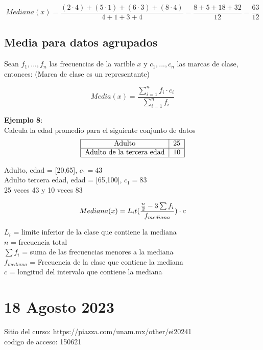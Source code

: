 \documentclass{article}
\begin{document}
\[
    Mediana(x) = \frac{(2\cdot4) + (5\cdot1) + (6\cdot3) + (8\cdot4)}{4+1+3+4} = \frac{8+5+18+32}{12} = \frac{63}{12}
\]

\subsection{Media para datos agrupados}

Sean $f_1, ... , f_n$ las frecuencias de la varible $x$ y $c_1, ... , c_n$ las marcas de clase, entonces: (Marca de clase es un representante)

\[
    Media(x) = \frac{\sum^{n}_{i=1}f_i \cdot c_i}{\sum^{n}_{i=1}f_i}
\]

\textbf{Ejemplo 8}: \\
Calcula la edad promedio para el siguiente conjunto de datos
\[
    \begin{tabular}{|c|c|}
        \hline
        Adulto                    & 25 \\
        \hline
        Adulto de la tercera edad & 10 \\
        \hline
    \end{tabular}
\]

Adulto, edad = [20,65], $c_1 = 43$ \\
Adulto tercera edad, edad = [65,100], $c_1 = 83$\\

25 veces 43 y 10 veces 83

\[
    Mediana(x) = L_{i} t(\frac{\frac{n}{2} - 3 \sum f_i}{f_{mediana}}) \cdot c \\ \\
\]

\noindent $L_i$ = limite inferior de la clase que contiene la mediana\\
$n$ = frecuencia total \\
$\sum f_i$ = suma de las frecuencias menores a la mediana\\
$f_{mediana}$ = Frecuencia de la clase que contiene la mediana\\
$c$ = longitud del intervalo que contiene la mediana \\

\newpage

\section{18 Agosto 2023}

Sitio del curso: https://piazza.com/unam.mx/other/ei20241 \\
codigo de acceso: 150621
\end{document}
